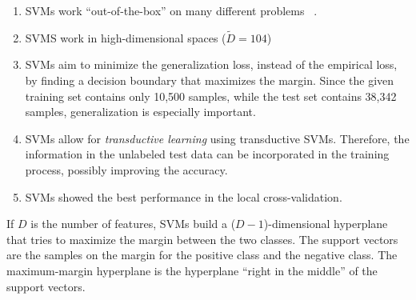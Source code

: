 \documentclass[a4paper]{article}
\begin{document}
\begin{enumerate}
\item SVMs work ``out-of-the-box'' on many different problems
  ~\cite{russell2003artificial}.
\item SVMS work in high-dimensional spaces ($\tilde{D} = 104$)
\item SVMs aim to minimize the generalization loss, instead of the
  empirical loss, by finding a decision boundary that maximizes the
  margin. Since the given training set contains only 10,500 samples,
  while the test set contains 38,342 samples, generalization is
  especially important.
\item SVMs allow for \emph{transductive learning} using transductive
  SVMs. Therefore, the information in the unlabeled test data can be
  incorporated in the training process, possibly improving the
  accuracy.
\item SVMs showed the best performance in the local cross-validation.
\end{enumerate}

If $D$ is the number of features, SVMs build a ($D-1$)-dimensional
hyperplane that tries to maximize the margin between the two
classes. The support vectors are the samples on the margin for the
positive class and the negative class. The maximum-margin hyperplane
is the hyperplane ``right in the middle'' of the support vectors.
\end{document}
